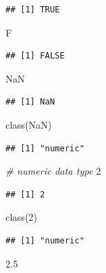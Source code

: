 \documentclass[
]{book}
\newenvironment{Shaded}{\begin{snugshade}}{\end{snugshade}}
\newcommand{\CommentTok}[1]{\textcolor[rgb]{0.56,0.35,0.01}{\textit{#1}}}
\newcommand{\ConstantTok}[1]{\textcolor[rgb]{0.00,0.00,0.00}{#1}}
\newcommand{\DecValTok}[1]{\textcolor[rgb]{0.00,0.00,0.81}{#1}}
\newcommand{\FloatTok}[1]{\textcolor[rgb]{0.00,0.00,0.81}{#1}}
\newcommand{\FunctionTok}[1]{\textcolor[rgb]{0.00,0.00,0.00}{#1}}
\newcommand{\NormalTok}[1]{#1}
\begin{document}
\begin{verbatim}
## [1] TRUE
\end{verbatim}

\begin{Shaded}
\begin{Highlighting}[]
\NormalTok{F}
\end{Highlighting}
\end{Shaded}

\begin{verbatim}
## [1] FALSE
\end{verbatim}

\begin{Shaded}
\begin{Highlighting}[]
\ConstantTok{NaN}
\end{Highlighting}
\end{Shaded}

\begin{verbatim}
## [1] NaN
\end{verbatim}

\begin{Shaded}
\begin{Highlighting}[]
\FunctionTok{class}\NormalTok{(}\ConstantTok{NaN}\NormalTok{)}
\end{Highlighting}
\end{Shaded}

\begin{verbatim}
## [1] "numeric"
\end{verbatim}

\begin{Shaded}
\begin{Highlighting}[]
\CommentTok{\# numeric data type}
\DecValTok{2}
\end{Highlighting}
\end{Shaded}

\begin{verbatim}
## [1] 2
\end{verbatim}

\begin{Shaded}
\begin{Highlighting}[]
\FunctionTok{class}\NormalTok{(}\DecValTok{2}\NormalTok{)}
\end{Highlighting}
\end{Shaded}

\begin{verbatim}
## [1] "numeric"
\end{verbatim}

\begin{Shaded}
\begin{Highlighting}[]
\FloatTok{2.5}
\end{Highlighting}
\end{Shaded}
\end{document}
